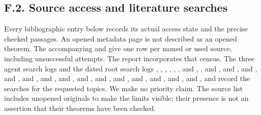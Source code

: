 \subsection{F.2. Source access and literature searches}
Every bibliographic entry below records its actual access state and the
precise checked passages. An opened metadata page is not described as
an opened theorem. The accompanying 
and  give one row per named or used source,
including unsuccessful attempts. The report incorporates that census.
The three agent search logs and the dated root search logs
, ,
, ,
, , and
, , and
, and
, and
, and
, and
, and
, and
, and
, and
, and
, and
, and
, and
, and
, and
record the searches for the requested topics. We make no priority claim.
The source list includes unopened originals to make the limits visible;
their presence is not an assertion that their theorems have been checked.
